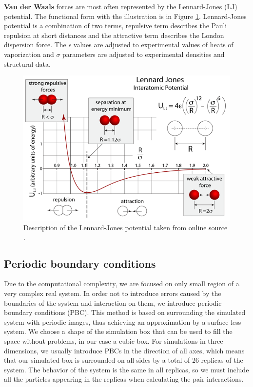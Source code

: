 \textbf{Van der Waals} forces are most often represented by the Lennard-Jones (LJ) potential. The functional form with the illustration is in Figure \ref{fig:lj}. Lennard-Jones potential is a combination of two terms, repulsive term describes the Pauli repulsion at short distances and the attractive term describes the London dispersion force. The $\epsilon$ values are adjusted to experimental values of heats of vaporization and $\sigma$ parameters are adjusted to experimental densities and structural data. 

\begin{figure}[H]
	\centering
	\includegraphics[width=1.0\linewidth]{img/lj.png} 
	\caption{Description of the Lennard-Jones potential taken from online source \cite{LJ}.}
	\label{fig:lj}    
\end{figure} 


\subsection{Periodic boundary conditions}
Due to the computational complexity, we are focused on only small region of a very complex real system.  In order not to introduce errors caused by the boundaries of the system and interaction on them, we introduce periodic boundary conditions (PBC). This method is based on surrounding the simulated system with periodic images, thus achieving an approximation by a surface less system. We choose a shape of the simulation box that can be used to fill the space without problems, in our case a cubic box. For simulations in three dimensions, we usually introduce PBCs in the direction of all axes, which means that our simulated box is surrounded on all sides by a total of 26 replicas of the system. The behavior of the system is the same in all replicas, so we must include all the particles appearing in the replicas when calculating the pair interactions. \cite{allen_computer_2017}

